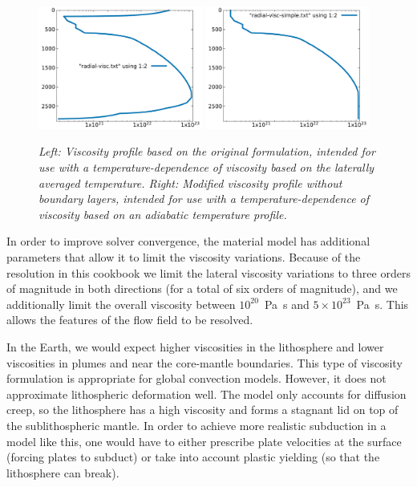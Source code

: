 \begin{figure}
  \includegraphics[width=0.48\textwidth]{cookbooks/steinberger/doc/radial-visc.pdf}
  \includegraphics[width=0.48\textwidth]{cookbooks/steinberger/doc/radial-visc-simple.pdf}
  \caption{\it Left: Viscosity profile based on the original \cite{stca06} formulation, intended for use with a temperature-dependence of viscosity based on the laterally averaged temperature. Right: Modified viscosity profile without boundary layers, intended for use with a temperature-dependence of viscosity based on an adiabatic temperature profile.}
  \label{fig:steinberger-viscosity}
\end{figure}

In order to improve solver convergence, the material model has additional parameters that allow it to limit the viscosity variations. 
Because of the resolution in this cookbook we limit the lateral viscosity variations to 
three orders of magnitude in both directions (for a total of six orders of
magnitude), and we additionally limit the overall viscosity
between $10^{20}$~\si{\pascal\second} and $5 \times 10^{23}$~\si{\pascal\second}. This allows the features of the flow field to be resolved. 

In the Earth, we would expect higher viscosities in the lithosphere and 
lower viscosities in plumes and near the core-mantle boundaries. 
This type of viscosity formulation is appropriate for global convection models. 
However, it does not approximate lithospheric deformation well. 
The model only accounts for diffusion creep, so the 
lithosphere has a high viscosity and forms a stagnant lid on top of the 
sublithospheric mantle. In order to achieve more realistic subduction in a model like this, 
one would have to either prescribe plate velocities at the surface 
(forcing plates to subduct) or take into account plastic yielding (so that
the lithosphere can break).

